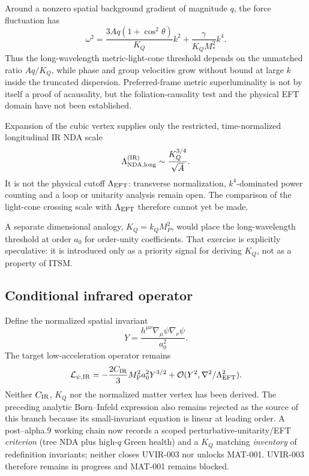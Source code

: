 Around a nonzero spatial background gradient of magnitude $q$, the force
fluctuation has
\begin{equation}
 \omega^2=\frac{3Aq(1+\cos^2\theta)}{K_Q}k^2
 +\frac{\gamma}{K_QM_*^2}k^4.
 \label{eq:force-dispersion}
\end{equation}
Thus the long-wavelength metric-light-cone threshold depends on the unmatched
ratio $Aq/K_Q$, while phase and group velocities grow without bound at large
$k$ inside the truncated dispersion.  Preferred-frame metric superluminality
is not by itself a proof of acausality, but the foliation-causality test and the
physical EFT domain have not been established.

Expansion of the cubic vertex supplies only the restricted, time-normalized
longitudinal IR NDA scale
\begin{equation}
 \Lambda_{\rm NDA,long}^{\rm (IR)}\sim\frac{K_Q^{3/4}}{\sqrt A}.
 \label{eq:long-nda}
\end{equation}
It is not the physical cutoff $\Lambda_{\rm EFT}$: transverse normalization,
$k^4$-dominated power counting and a loop or unitarity analysis remain open.
The comparison of the light-cone crossing scale with $\Lambda_{\rm EFT}$
therefore cannot yet be made.

A separate dimensional analogy, $K_Q=k_QM_P^2$, would place the
long-wavelength threshold at order $a_0$ for order-unity coefficients.  That
exercise is explicitly speculative: it is introduced only as a priority
signal for deriving $K_Q$, not as a property of ITSM.

\subsection{Conditional infrared operator}

Define the normalized spatial invariant
\begin{equation}
 Y=\frac{h^{\mu\nu}\nabla_\mu\psi\nabla_\nu\psi}{a_0^2}.
 \label{eq:Y}
\end{equation}
The target low-acceleration operator remains
\begin{equation}
 \mathcal L_{\psi,\rm IR}
 =-\frac{2C_{\rm IR}}{3}M_{\mathrm P}^2a_0^2Y^{3/2}
 +\mathcal O(Y^2,\nabla^2/\Lambda_{\rm EFT}^2).
 \label{eq:ir-action}
\end{equation}
Neither $C_{\rm IR}$, $K_Q$ nor the normalized matter vertex has been derived.
The preceding analytic Born--Infeld expression also remains rejected as the
source of this branch because its small-invariant equation is linear at
leading order.  A post--alpha.9 working chain now records a scoped
perturbative-unitarity/EFT \emph{criterion} (tree NDA plus high-$q$ Green
health) and a $K_Q$ matching \emph{inventory} of redefinition invariants;
neither closes UVIR-003 nor unlocks MAT-001.  UVIR-003 therefore remains in
progress and MAT-001 remains blocked.

